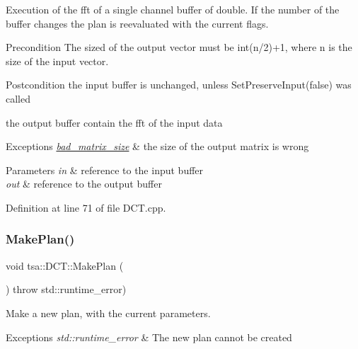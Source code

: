 Execution of the fft of a single channel buffer of double. If the number of the buffer changes the plan is reevaluated with the current flags.

\begin{DoxyPrecond}{Precondition}
The sized of the output vector must be int(n/2)+1, where n is the size of the input vector.
\end{DoxyPrecond}
\begin{DoxyPostcond}{Postcondition}
the input buffer is unchanged, unless Set\+Preserve\+Input(false) was called 

the output buffer contain the fft of the input data
\end{DoxyPostcond}

\begin{DoxyExceptions}{Exceptions}
{\em \hyperlink{classtsa_1_1bad__matrix__size}{bad\+\_\+matrix\+\_\+size}} & the size of the output matrix is wrong \\
\hline
\end{DoxyExceptions}

\begin{DoxyParams}{Parameters}
{\em in} & reference to the input buffer \\
\hline
{\em out} & reference to the output buffer \\
\hline
\end{DoxyParams}


Definition at line 71 of file D\+C\+T.\+cpp.

\mbox{\label{classtsa_1_1_d_c_t_a2d24c07a7b3f96b16056eee1ab9bad89}} 
\subsubsection{\texorpdfstring{Make\+Plan()}{MakePlan()}}
{\footnotesize\ttfamily void tsa\+::\+D\+C\+T\+::\+Make\+Plan (\begin{DoxyParamCaption}{ }\end{DoxyParamCaption}) throw  std\+::runtime\+\_\+error) \hspace{0.3cm}{\ttfamily [virtual]}}

Make a new plan, with the current parameters.


\begin{DoxyExceptions}{Exceptions}
{\em std\+::runtime\+\_\+error} & The new plan cannot be created \\
\hline
\end{DoxyExceptions}


